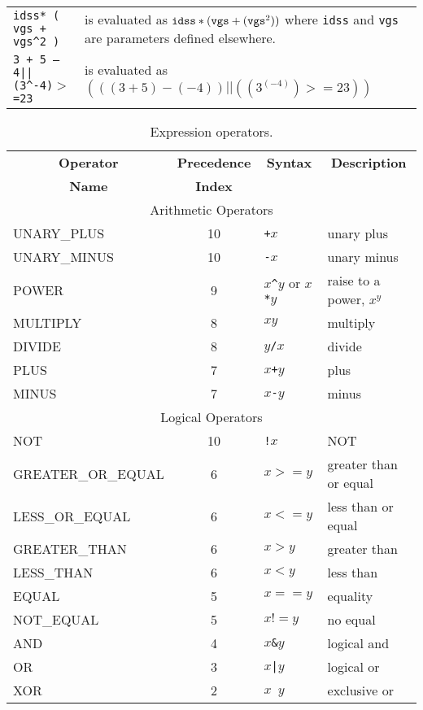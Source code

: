     \begin{tabular}{lp{3.5in}}
    {\tt idss* ( vgs + vgs\^{}2 )} & is evaluated as 
			     ${\tt idss} * ( {\tt vgs} + ({\tt vgs} ^ 2) )$
			     \newline
                             where {\tt idss} and {\tt vgs} are parameters
			     defined elsewhere.\\
                     
    {\tt 3 + 5 -- 4||(3\^{}-4)$>$=23}
				& is evaluated as \newline
				 $(((3 + 5) - (-4)) || ((3 ^ (-4)) >= 23))$\\
    \end{tabular}

\begin{table}
\caption{Expression operators.\label{table:expression:operators}}
\begin{center}
\begin{tabular}{|l|c|l|l|}
\hline
\multicolumn{1}{|c}{\bf Operator } &
\multicolumn{1}{|c}{\bf Precedence} &
\multicolumn{1}{|c}{\bf Syntax } &
\multicolumn{1}{|c|}{\bf Description}  \\
\multicolumn{1}{|c}{\bf  Name } &
\multicolumn{1}{|c}{\bf  Index } &
\multicolumn{1}{|c}{} &
\multicolumn{1}{|c|}{} \\
\hline
\hline
\multicolumn{4}{|c|}{Arithmetic Operators} \\
UNARY\_PLUS	& 10& {\tt +}$x$            	& unary plus \\
UNARY\_MINUS	& 10& {\tt -}$x$            	& unary minus \\
POWER		& 9 & $x${\tt \^{}}$y$  or
                  $x${\tt **}$y$ 		& raise to a power, $x^y$ \\
MULTIPLY	& 8 & $x${\tt *}$y$		& multiply \\
DIVIDE		& 8 & $y${\tt /}$x$	        & divide \\
PLUS		& 7 & $x${\tt +}$y$		& plus \\
MINUS		& 7 & $x${\tt -}$y$		& minus \\
\hline
\hline
\multicolumn{4}{|c|}{Logical Operators} \\
\hline
NOT		& 10& {\tt !}$x$		& NOT \\
GREATER\_OR\_EQUAL& 6 & $x>=y$			& greater than or equal \\
LESS\_OR\_EQUAL	& 6 & $x<=y$			& less than or equal \\
GREATER\_THAN	& 6 & $x>y$			& greater than \\
LESS\_THAN	& 6 & $x<y$			& less than \\
EQUAL		& 5 & $x==y$			& equality \\
NOT\_EQUAL	& 5 & $x!=y$			& no equal \\
AND		& 4 & $x${\tt \&}$y$           	& logical and \\
OR		& 3 & $x${\tt |}$y$           	& logical or \\
XOR		& 2 & $x${\tt ~}$y$		& exclusive or \\
\hline
\end{tabular}
\end{center}
\end{table}

